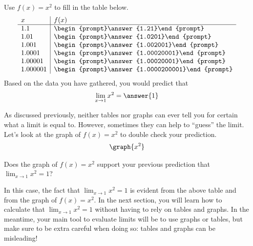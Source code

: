 \documentclass[handout]{ximera}
\begin{document}
\begin{exercise}
Use $f(x) = x^2$ to fill in the table below.
  \[
  \begin{array}{l|l}
    x      & f(x)      \\ \hline
    1.1    & \begin{prompt}\answer{1.21}\end{prompt}\\
    1.01   & \begin{prompt}\answer{1.0201}\end{prompt}\\
    1.001  & \begin{prompt}\answer{1.002001}\end{prompt}\\
    1.0001 & \begin{prompt}\answer{1.00020001}\end{prompt}\\
    1.00001 & \begin{prompt}\answer{1.00020001}\end{prompt}\\
    1.000001 & \begin{prompt}\answer{1.0000200001}\end{prompt}
  \end{array}
  \]
  Based on the data you have gathered, you would predict that 
  \[
  \lim_{x\to 1} x^2 = \answer{1}
  \]
  
    \begin{exercise}
    As discussed previously, neither tables nor graphs can ever tell you for certain what a limit is equal to. However, sometimes they can help to ``guess'' the limit. Let's look at the graph of $f(x) = x^2$ to double check your prediction. 
\[
\graph{x^2}
\]

Does the graph of $f(x) = x^2$ support your previous prediction that $\lim_{x\to 1} x^2 = 1$? 

\begin{multipleChoice}
    
\begin{feedback}[correct]

In this case, the fact that $\lim_{x\to 1} x^2 = 1$ is evident from the above table and from the graph of $f(x) = x^2$.  In the next section, you will learn how to calculate that $\lim_{x\to 1} x^2 = 1$ without having to rely on tables and graphs.  In the meantime, your main tool to evaluate limits will be to use graphs or tables, but make sure to be extra careful when doing so: tables and graphs can be misleading! 

\end{feedback}
\end{multipleChoice}
    \end{exercise}

\end{exercise}
\end{document}
